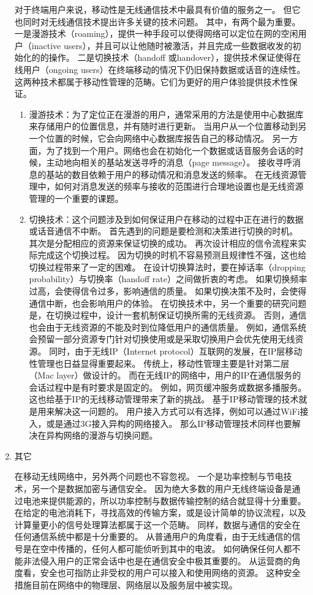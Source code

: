 \begin{enumerate}[1)]
对于终端用户来说，移动性是无线通信技术中最具有价值的服务之一。
但它也同时对无线通信技术提出许多关键的技术问题。
其中，有两个最为重要。一是漫游技术（roaming），提供一种手段可以使得网络可以定位在网的空闲用户（inactive users），并且可以让他随时被激活，并且完成一些数据收发的初始化的的操作。
二是切换技术（handoff 或handover），提供技术保证使得在线用户（ongoing users）在终端移动的情况下仍旧保持数据或话音的连续性。
这两种技术都属于移动性管理的范畴。它们为更好的用户体验提供技术性保证。
\begin{enumerate}[(1)]
\item 漫游技术：为了定位正在漫游的用户，通常采用的方法是使用中心数据库来存储用户的位置信息，并有随时进行更新。
当用户从一个位置移动到另一个位置的时候，它会向网络中心数据库报告自己的移动情况。
另一方面，为了找到一个用户。网络也会在初始化一个数据或话音服务会话的时候，主动地向相关的基站发送寻呼的消息（page message）。
接收寻呼消息的基站的数目依赖于用户的移动情况和消息发送的频率。
在无线资源管理中，如何对消息发送的频率与接收的范围进行合理地设置也是无线资源管理的一个重要的课题。
\item 切换技术：这个问题涉及到如何保证用户在移动的过程中正在进行的数据或话音通信不中断。
首先遇到的问题是要检测和决策进行切换的时机。
其次是分配相应的资源来保证切换的成功。
再次设计相应的信令流程来实际完成这个切换过程。
因为切换的时机不容易预测且规律性不强，这也给切换过程带来了一定的困难。
在设计切换算法时，要在掉话率（dropping probability）与切换率（handoff rate）之间做折衷的考虑。
如果切换频率过高，会使得信令过多，影响通信的质量。
如果切换决策不及时，会使得通信中断，也会影响用户的体验。
在切换技术中，另一个重要的研究问题是，在切换过程中，设计一套机制保证切换所需的无线资源。
否则，通信也会由于无线资源的不能及时到位降低用户的通信质量。
例如，通信系统会预留一部分资源专门针对切换使用或是采取切换用户会优先使用无线资源。
同时，由于无线IP（Internet protocol）互联网的发展，在IP层移动性管理也日益显得重要起来。
传统上，移动性管理主要是针对第二层（Mac layer）做设计的。
而在无线IP的网络中，用户的IP在通信服务的会话过程中是有时要求是固定的。
例如，网页缓冲服务或数据多播服务。这也给基于IP的无线移动管理带来了新的挑战。
基于IP移动管理的技术就是用来解决这一问题的。
用户接入方式可以有选择，例如可以通过WiFi接入，或是通过3G接入异构的网络接入。
那么IP移动管理技术同样也要解决在异构网络的漫游与切换问题。
\end{enumerate}
%
\item 其它
\par 在移动无线网络中，另外两个问题也不容忽视。
一个是功率控制与节电技术，另一个是数据加密与通信安全。
因为绝大多数的用户无线终端设备是通过电池来提供能源的，所以功率控制与数据传输控制的结合就显得十分重要。
在给定的电池消耗下，寻找高效的传输方案，或是设计简单的协议流程，以及计算量更小的信号处理算法都属于这一个范畴。
同样，数据与通信的安全在任何通信系统中都是十分重要的。
从普通用户的角度看，由于无线通信的信号是在空中传播的，任何人都可能侦听到其中的电波。
如何确保任何人都不能非法侵入用户的正常会话中也是在通信安全中极其重要的。
从运营商的角度看，安全也可指防止非受权的用户可以接入和使用网络的资源。
这种安全措施目前在网络中的物理层、网络层以及服务层中被实现。
\end{enumerate}
